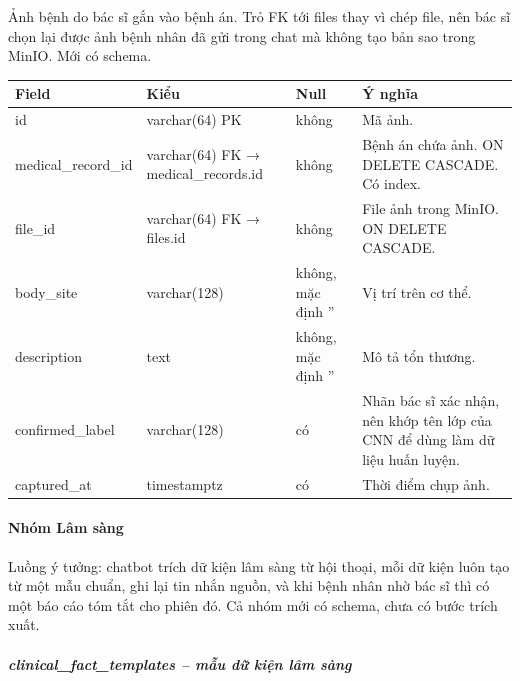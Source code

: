 Ảnh bệnh do bác sĩ gắn vào bệnh án. Trỏ FK tới files thay vì chép file, nên bác sĩ chọn lại được ảnh bệnh nhân đã gửi trong chat mà không tạo bản sao trong MinIO. Mới có schema.
\begin{longtable}{|>{\raggedright\arraybackslash}p{0.250\dimexpr\linewidth-8\tabcolsep\relax}|>{\raggedright\arraybackslash}p{0.250\dimexpr\linewidth-8\tabcolsep\relax}|>{\raggedright\arraybackslash}p{0.250\dimexpr\linewidth-8\tabcolsep\relax}|>{\raggedright\arraybackslash}p{0.250\dimexpr\linewidth-8\tabcolsep\relax}|}
\hline
\textbf{Field} & \textbf{Kiểu} & \textbf{Null} & \textbf{Ý nghĩa} \\ \hline
\endhead
id & varchar(64) PK & không & Mã ảnh. \\ \hline
medical\_record\_id & varchar(64) FK → medical\_records.id & không & Bệnh án chứa ảnh. ON DELETE CASCADE. Có index. \\ \hline
file\_id & varchar(64) FK → files.id & không & File ảnh trong MinIO. ON DELETE CASCADE. \\ \hline
body\_site & varchar(128) & không, mặc định '' & Vị trí trên cơ thể. \\ \hline
description & text & không, mặc định '' & Mô tả tổn thương. \\ \hline
confirmed\_label & varchar(128) & có & Nhãn bác sĩ xác nhận, nên khớp tên lớp của CNN để dùng làm dữ liệu huấn luyện. \\ \hline
captured\_at & timestamptz & có & Thời điểm chụp ảnh. \\ \hline
\end{longtable}

\paragraph{Nhóm Lâm sàng}

Luồng ý tưởng: chatbot trích dữ kiện lâm sàng từ hội thoại, mỗi dữ kiện luôn tạo từ một mẫu chuẩn, ghi lại tin nhắn nguồn, và khi bệnh nhân nhờ bác sĩ thì có một báo cáo tóm tắt cho phiên đó. Cả nhóm mới có schema, chưa có bước trích xuất.

\subparagraph{clinical\_fact\_templates -- mẫu dữ kiện lâm sàng}

